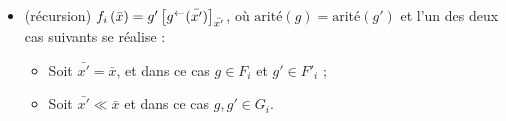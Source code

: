 \begin{definition}[$a$-LSRS]
\begin{itemize}[itemsep=-1mm]
				\item 	(récursion)		$f_i\left(\bar{x}\right) = g'\left[ g^{\leftarrow}(\bar{x'}) \right]_{\bar{x'}}$, où $\text{arité}(g) = \text{arité}(g')$ et l'un des deux cas suivants se réalise :
						\begin{itemize}[itemsep=-1mm]
							\item 	Soit $\bar{x'} = \bar{x}$, et dans ce cas $g \in F_i$ et $g' \in F'_i$ ;
							\item 	Soit $\bar{x'} \ll \bar{x}$ et dans ce cas $g, g' \in G_i$. 
						\end{itemize}
%						
%						
			\end{itemize}
			
		\end{definition}
		
